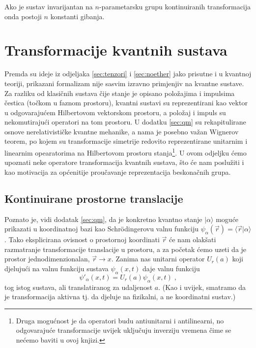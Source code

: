 \begin{teorem}[Noether]
Ako je sustav invarijantan na $n$-parametarsku
grupu kontinuiranih transformacija onda postoji $n$ konstanti gibanja.
  
 
\end{teorem}

\section{Transformacije kvantnih sustava}
\label{sec:qmtrans}

Premda su ideje iz odjeljaka \ref{sec:tenzori} i \ref{sec:noether}
jako prisutne i u kvantnoj teoriji, prikazani formalizam nije sasvim
izravno primjenjiv na kvantne sustave. Za razliku od klasičnih sustava
čije stanje je opisano položajima i impulsima čestica (točkom u faznom
prostoru), kvantni sustavi su reprezentirani kao vektor
u odgovarajućem Hilbertovom vektorskom prostoru, a položaj i impuls
su nekomutirajući operatori na tom prostoru. U dodatku \ref{sec:qm}
su rekapitulirane osnove nerelativističke kvantne mehanike, a
nama je posebno važan Wignerov teorem, po kojem su transformacije simetrije
redovito reprezentirane unitarnim i linearnim opearatorima na
Hilbertovom prostoru stanja\footnote{Druga mogućnost je da operatori
    budu antiunitarni i antilinearni, no odgovarajuće transformacije
    uvijek uključuju inverziju vremena čime se nećemo baviti u ovoj
    knjizi.}.
U ovom odjeljku ćemo upoznati neke operatore transformacija kvantnih
sustava, što će nam poslužiti i kao motivacija za općenitije
proučavanje reprezentacija beskonačnih grupa.
 

\subsection{Kontinuirane prostorne translacije}
\label{sec:prostornetranslacije}

Poznato je, vidi dodatak \ref{sec:qm}, da je konkretno kvantno stanje
$|\alpha\rangle$ moguće prikazati u koordinatnoj bazi kao Schr\"{o}dingerovu
valnu funkciju $\psi_{\alpha}(\vec{r}) = \langle \vec{r} | \alpha\rangle$.
Tako eksplicirana ovisnost o prostornoj koordinati $\vec{r}$ će nam
olakšati razmatranje transformacije translacije u prostoru, a za početak
ćemo uzeti da je prostor jednodimenzionalan, $\vec{r} \to x$.
Zanima nas unitarni operator $U_{r}(a)$ koji djelujući na valnu
funkciju sustava $\psi_{\alpha}(x, t)$ daje valnu funkciju 
\begin{equation}
  \psi'_{\alpha}(x,t)= U_{r}(a)\psi_{\alpha}(x,t) \;,
\end{equation}
tog istog sustava, ali translatiranog za udaljenost $a$. (Kao i uvijek,
smatramo da je transformacija aktivna tj. da djeluje na fizikalni,
a ne koordinatni sustav.)


